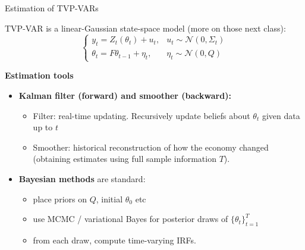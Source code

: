 \documentclass{beamer}
\begin{document}
\begin{frame}{Estimation of TVP-VARs}
\small

TVP-VAR is a linear-Gaussian state-space model (more on those next class):
\[
\begin{cases}
y_t = Z_t(\theta_t) + u_t, & u_t \sim \mathcal{N}(0,\Sigma_t) \\
\theta_t = F \theta_{t-1} + \eta_t, & \eta_t \sim \mathcal{N}(0,Q)
\end{cases}
\]

\textbf{Estimation tools}
\begin{itemize}
  \item \textbf{Kalman filter (forward) and smoother (backward):}
        \begin{itemize}
          \item Filter: real-time updating. Recursively update beliefs about $\theta_t$ given data up to $t$
          \item Smoother: historical reconstruction of how the economy changed (obtaining estimates using full sample information $T$).
        \end{itemize}
  \item \textbf{Bayesian methods} are standard:
        \begin{itemize}
          \item place priors on $Q$, initial $\theta_0$ etc
          \item use MCMC / variational Bayes for posterior draws of
                $\{\theta_t\}_{t=1}^T$
          \item from each draw, compute time-varying IRFs.
        \end{itemize}
\end{itemize}


\end{frame}
\end{document}
